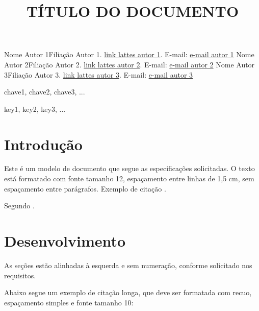 \documentclass{wticifes2025}
\begin{document}
\onehalfspacing

\title{TÍTULO DO DOCUMENTO}
\maketitle
{Nome Autor 1}{Filiação Autor 1. \url{link lattes autor 1}. E-mail: \url{e-mail autor 1}}
{Nome Autor 2}{Filiação Autor 2. \url{link lattes autor 2}. E-mail: \url{e-mail autor 2}}
{Nome Autor 3}{Filiação Autor 3. \url{link lattes autor 3}. E-mail: \url{e-mail autor 3}}


\begin{resumo}
\lipsum[1]
\end{resumo}

\begin{palavraschave}
    chave1, chave2, chave3, ...
\end{palavraschave}

\vspace{0.5cm}
\begin{abstract}
\lipsum[1]
\end{abstract}

\begin{keywords}
    key1, key2, key3, ...
\end{keywords}

\section{Introdução}
Este é um modelo de documento que segue as especificações solicitadas. O texto está formatado com fonte tamanho 12, espaçamento entre linhas de 1,5 cm, sem espaçamento entre parágrafos. Exemplo de citação \cite{teste2023}.

Segundo .

\lipsum[1]

\section{Desenvolvimento}
As seções estão alinhadas à esquerda e sem numeração, conforme solicitado
nos requisitos.

\lipsum[1]

Abaixo segue um exemplo de citação longa, que deve ser formatada com recuo, espaçamento simples e fonte tamanho 10:
\end{document}
